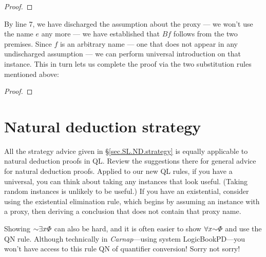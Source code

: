 \begin{proof}
	 \pr{}
	 
	\open
	\close
\end{proof}

By line 7, we have discharged the assumption about the proxy --- we won't use the name $e$ any more --- we have established that $Bf$ follows from the two premises. Since $f$ is an arbitrary name --- one that does not appear in any undischarged assumption --- we can perform universal introduction on that instance. This in turn lets us complete the proof via the two substitution rules mentioned above:

\begin{proof}
	 \pr{}
	 
	\open
	\close
\end{proof}



\section{Natural deduction strategy}

All the strategy advice given in \S\ref{sec.SL.ND.strategy} is equally applicable to natural deduction proofs in QL. Review the suggestions there for general advice for natural deduction proofs. Applied to our new QL rules, if you have a universal, you can think about taking any instances that look useful. (Taking random instances is unlikely to be useful.) If you have an existential, consider using the existential elimination rule, which begins by assuming an instance with a proxy, then deriving a conclusion that does not contain that proxy name.

Showing $\enot \qt{\exists}{x}\metaA{}$ can also be hard, and it is often easier to show  $\qt{\forall}{x}\enot \metaA{}$ and use the QN rule. {\color{black} Although technically in \textit{Carnap}---using system LogicBookPD---you won't have access to this rule QN of quantifier conversion! Sorry not sorry!} 



